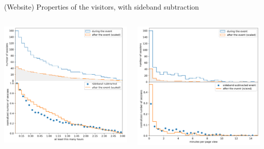 \documentclass[aspectratio=169]{beamer}
\begin{document}
\begin{frame}{(Website) Properties of the visitors, with sideband subtraction}
\Large
\vspace{0.5 cm}
\begin{columns}
\includegraphics[width=\linewidth]{PLOTS/during-and-after-event-time-spent.pdf}

\includegraphics[width=\linewidth]{PLOTS/during-and-after-event-time-per-page-view.pdf}


\end{columns}
\end{frame}
\end{document}
